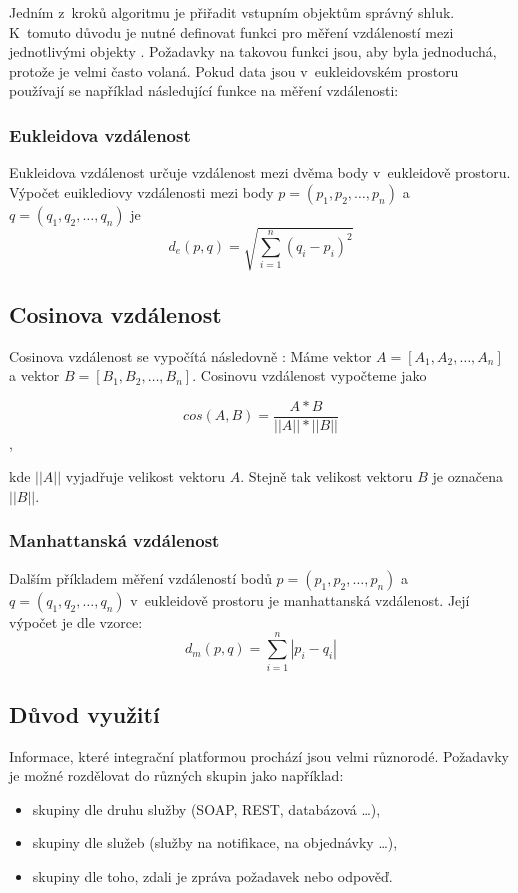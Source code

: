 \documentclass[thesis=M,czech]{FITthesis}[2012/10/20]
\begin{document}
			Jedním z~kroků algoritmu je přiřadit vstupním objektům správný shluk. K~tomuto důvodu je nutné definovat funkci pro měření vzdáleností mezi jednotlivými objekty \cite{IntroductionToDataMining}. Požadavky na takovou funkci jsou, aby byla jednoduchá, protože je velmi často volaná. Pokud data jsou v~eukleidovském prostoru používají se například následující funkce na měření vzdálenosti:
			
				\subsubsection{Eukleidova vzdálenost}
				\label{sec:eukleid_distance}
				Eukleidova vzdálenost určuje vzdálenost mezi dvěma body v~eukleidově prostoru. Výpočet euiklediovy vzdálenosti mezi body $p = (p_1, p_2, \ldots, p_n)$ a $q = (q_1, q_2, \ldots, q_n)$ je
				$$d_e(p,q) = \sqrt{\sum_{i = 1}^{n}(q_i - p_i)^2}$$
				
				\subsection{Cosinova vzdálenost}
				\label{sec:cosine_distance}
				Cosinova vzdálenost se vypočítá následovně \cite{cosine-similarity}: Máme vektor $A = [A_1,A_2,\ldots,A_n]$ a vektor $B = [B_1,B_2,\ldots,B_n]$. Cosinovu vzdálenost vypočteme jako
				
				$$cos(A,B) = \frac{A*B}{||A|| * ||B||}$$,
				
				kde $||A||$ vyjadřuje velikost vektoru $A$. Stejně tak velikost vektoru $B$ je označena $||B||$.
				
		
				
				\subsubsection{Manhattanská vzdálenost}
				Dalším příkladem měření vzdáleností bodů $p = (p_1, p_2, \ldots, p_n)$ a $q = (q_1, q_2, \ldots, q_n)$ v~eukleidově prostoru je manhattanská vzdálenost. Její výpočet je dle vzorce:
				$$d_m(p,q) = \sum_{i = 1}^{n} |p_i - q_i| $$
				
		\subsection{Důvod využití}
			Informace, které integrační platformou prochází jsou velmi různorodé. Požadavky je možné rozdělovat do různých skupin jako například:
			
			\begin{itemize} 
				\item skupiny dle druhu služby (SOAP, REST, databázová \ldots),
				\item skupiny dle služeb (služby na notifikace, na objednávky \ldots),
				\item skupiny dle toho, zdali je zpráva požadavek nebo odpověď.		
			\end{itemize}
		
\end{document}
